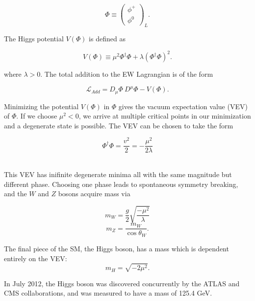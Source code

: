 \begin{equation}
\Phi \equiv \begin{pmatrix}\phi^{+} \\ \phi^{0}\end{pmatrix}_{L}.
\end{equation}

\noindent The Higgs potential $V(\Phi)$ is defined as

\begin{equation}
V(\Phi) \equiv \mu^{2}\Phi^{\dagger}\Phi + \lambda\left(\Phi^{\dagger}\Phi\right)^{2}.
\end{equation}

\noindent where $\lambda > 0$. The total addition to the EW Lagrangian is of the form

\begin{equation}
\mathcal{L}_{Add} = D_{\mu}\Phi\ D^{\mu}\Phi - V(\Phi).
\end{equation}

Minimizing the potential $V(\Phi)$ in $\Phi$ gives the vacuum expectation value (VEV) of $\Phi$. If we choose $\mu^{2} < 0$, we arrive at multiple critical points in our minimization and a degenerate state is possible. The VEV can be chosen to take the form

\begin{equation}
\Phi^\dagger\Phi = \frac{v^2}{2} = -\frac{\mu^2}{2\lambda}
\end{equation}~\cite{srednicki}

This VEV has inifinite degenerate minima all with the same magnitude but different phase. Choosing one phase leads to spontaneous symmetry breaking, and the $W$ and $Z$ bosons acquire mass via\cite{halzen}

\begin{equation}
m_{W} = \frac{g}{2}\sqrt{\frac{-\mu^{2}}{\lambda}}
\end{equation}
\begin{equation}
m_{Z} = \frac{m_{W}}{\cos{\theta_W}}.
\end{equation}

The final piece of the SM, the Higgs boson, has a mass which is dependent entirely on the VEV:
\begin{equation}
m_H = \sqrt{-2\mu^2}.
\end{equation}

In July 2012, the Higgs boson was discovered concurrently by the ATLAS and CMS collaborations, and was measured to have a mass of 125.4 GeV.~\cite{CMSHiggs}~\cite{ATLASHiggs}


